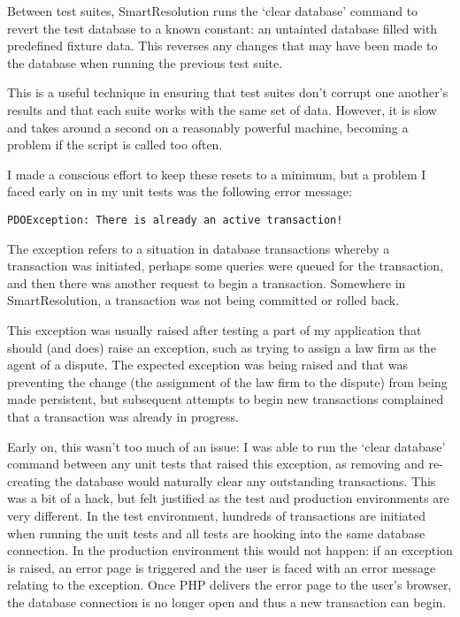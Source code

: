 Between test suites, SmartResolution runs the `clear database' command to revert the test database to a known constant: an untainted database filled with predefined fixture data. This reverses any changes that may have been made to the database when running the previous test suite.

This is a useful technique in ensuring that test suites don't corrupt one another's results and that each suite works with the same set of data. However, it is slow and takes around a second on a reasonably powerful machine, becoming a problem if the script is called too often.

I made a conscious effort to keep these resets to a minimum, but a problem I faced early on in my unit tests was the following error message:

\begin{lstlisting}
PDOException: There is already an active transaction!
\end{lstlisting}

The exception refers to a situation in database transactions whereby a transaction was initiated, perhaps some queries were queued for the transaction, and then there was another request to begin a transaction. Somewhere in SmartResolution, a transaction was not being committed or rolled back.

This exception was usually raised after testing a part of my application that should (and does) raise an exception, such as trying to assign a law firm as the agent of a dispute. The expected exception was being raised and that was preventing the change (the assignment of the law firm to the dispute) from being made persistent, but subsequent attempts to begin new transactions complained that a transaction was already in progress.

Early on, this wasn't too much of an issue: I was able to run the `clear database' command between any unit tests that raised this exception, as removing and re-creating the database would naturally clear any outstanding transactions. This was a bit of a hack, but felt justified as the test and production environments are very different. In the test environment, hundreds of transactions are initiated when running the unit tests and all tests are hooking into the same database connection. In the production environment this would not happen: if an exception is raised, an error page is triggered and the user is faced with an error message relating to the exception. Once PHP delivers the error page to the user's browser, the database connection is no longer open and thus a new transaction can begin.

